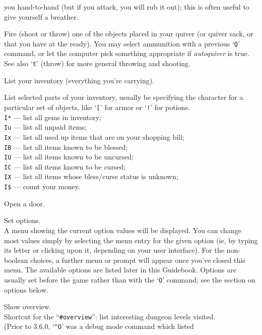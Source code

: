 you hand-to-hand (but if you attack, you will rub it out); this is
often useful to give yourself a breather.
\item[\tb{f}]
Fire (shoot or throw) one of the objects placed in your quiver (or
quiver sack, or that you have at the ready).
You may select ammunition with a previous `{\tt Q}' command, or let the
computer pick something appropriate if {\it autoquiver\/} is true.\\
See also `{\tt t}' (throw) for more general throwing and shooting.
\item[\tb{i}]
List your inventory (everything you're carrying).
\item[\tb{I}]
List selected parts of your inventory, usually be specifying the character
for a particular set of objects, like `{\tt [}' for armor or `{\tt !}'
for potions.\\
{\tt I*} --- list all gems in inventory;\\
{\tt Iu} --- list all unpaid items;\\
{\tt Ix} --- list all used up items that are on your shopping bill;\\
{\tt IB} --- list all items known to be blessed;\\
{\tt IU} --- list all items known to be uncursed;\\
{\tt IC} --- list all items known to be cursed;\\
{\tt IX} --- list all items whose bless/curse status is unknown;\\
{\tt I\$} --- count your money.
\item[\tb{o}]
Open a door.
\item[\tb{O}]
Set options.\\
A menu showing the current option values will be
displayed.  You can change most values simply by selecting the menu
entry for the given option (ie, by typing its letter or clicking upon
it, depending on your user interface).  For the non-boolean choices,
a further menu or prompt will appear once you've closed this menu.
The available options
are listed later in this Guidebook.  Options are usually set before the
game rather than with the `{\tt O}' command; see the section on options below.
\item[\tb{\^{}O}]
Show overview.\\
Shortcut for the ``{\tt \#overview}'':
list interesting dungeon levels visited.\\
(Prior to 3.6.0, `{\tt \^{}O}' was a debug mode command which listed
